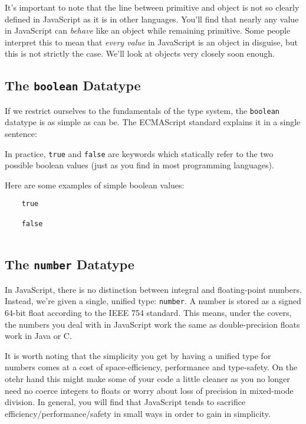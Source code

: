 \documentclass[11pt,letter]{book}
\begin{document}
    It's important to note that the line between primitive and object is not so clearly defined
    in JavaScript as it is in other languages. You'll find that nearly any value in JavaScript can
    \emph{behave} like an object while remaining primitive. Some people interpret this to mean that
    \emph{every value} in JavaScript is an object in disguise, but this is not strictly the case.
    We'll look at objects very closely soon enough.
    
    \subsection{The \texttt{boolean} Datatype}
    If we restrict ourselves to the fundamentals of the type system, the \texttt{boolean} 
    datatype is as simple as can be. The ECMAScript standard explains it in a single sentence:
    
    In practice, \texttt{true} and \texttt{false} are keywords which  statically refer to the two 
    possible boolean values (just as you find in most programming languages). 
    
    Here are some examples of simple boolean values:
    
    \begin{verbatim}
    true
    
    false
    
    \end{verbatim}
    
    \subsection{The \texttt{number} Datatype}
    In JavaScript, there is no distinction between integral and floating-point numbers. Instead, 
    we're given a single, unified type: \texttt{number}. A number is stored as a signed 64-bit float 
    according to the IEEE 754 standard. This means, under the covers, the numbers you deal with in
    JavaScript work the same as double-precision floats work in Java or C.
    
    It is worth noting that the simplicity you get by having a unified type for numbers comes at a 
    cost of space-efficiency, performance and type-safety. On the otehr hand this might make some of 
    your code a little cleaner as you no longer need no coerce integers to floats or worry about 
    loss of precision in mixed-mode division. In general, you will find that JavaScript tends to 
    sacrifice efficiency/performance/safety in small ways in order to gain in simplicity.
    
\end{document}
